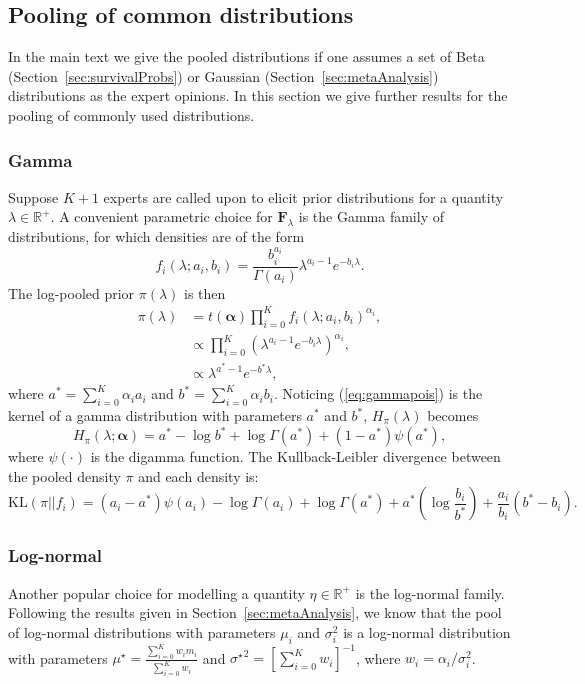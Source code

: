 \documentclass[a4paper, notitlepage, 11pt]{article}
\begin{document}
\newpage
\subsection{Pooling of common distributions}
\label{sec:appendix_common_poolings}

In the main text we give the pooled distributions if one assumes a set of Beta (Section~\ref{sec:survivalProbs}) or Gaussian (Section~\ref{sec:metaAnalysis}) distributions as the expert opinions.
In this section we give further results for the pooling of commonly used distributions.

\subsubsection{Gamma}
\label{sec:gamma}
Suppose $K + 1$ experts are called upon to elicit prior distributions for a quantity $\lambda \in \mathbb{R}^+$.
A convenient parametric choice for $\mathbf{F}_\lambda$ is the Gamma family of distributions, for which densities are of the form
$$ f_i(\lambda;a_i,b_i) = \frac{b_i^{a_i}}{\Gamma(a_i)} \lambda^{a_i-1} e^{-b_i\lambda}.$$
The log-pooled prior $\pi(\lambda)$ is then
\begin{align}
\nonumber
\pi(\lambda)&= t(\boldsymbol\alpha)\prod_{i=0}^{K}f_i(\lambda;a_i,b_i)^{\alpha_i},\\
\nonumber
&\propto \prod_{i=0}^{K} \left(\lambda^{a_i-1} e^{-b_i\lambda}\right)^{\alpha_i},\\
\label{eq:gammapois}
&\propto \lambda^{a^*-1} e^{-b^*\lambda},
\end{align}
where $a^* =\sum_{i=0}^{K}\alpha_ia_i$ and $b^* = \sum_{i=0}^{K}\alpha_ib_i$.
Noticing (\ref{eq:gammapois}) is the kernel of a gamma distribution with parameters $a^*$ and $b^*$, $H_{\pi}(\lambda)$ becomes
\begin{equation}
\label{eq:entropygamma}
H_{\pi}(\lambda; \boldsymbol\alpha) = a^* - \log b^* + \log \Gamma(a^*) + (1-a^*)\psi(a^*),
\end{equation}
where $\psi(\cdot)$ is the digamma function.
The Kullback-Leibler divergence between the pooled density $\pi$ and each density is:
\begin{equation}
 \label{eq:KLgamma}
 \text{KL}(\pi || f_i) = (a_i-a^*)\psi(a_i) - \log\Gamma(a_i) + \log\Gamma(a^*) + a^*\left(\log\frac{b_i}{b^*}\right) + \frac{a_i}{b_i}(b^*-b_i).
\end{equation}

\subsubsection{Log-normal} 
\label{sec:log-normal}
Another popular choice for modelling a quantity $\eta \in \mathbb{R}^+$ is the log-normal family.
Following the results given in Section~\ref{sec:metaAnalysis}, we know that the pool of log-normal distributions with parameters $\mu_i$ and $\sigma_i^2$ is a log-normal distribution with parameters $\mu^\star = \frac{\sum_{i=0}^K w_im_i}{\sum_{i=0}^K w_i}$ and ${\sigma^\star}^2 = [\sum_{i=0}^K w_i]^{-1}$,  where $w_i = \alpha_i/\sigma_i^2$.
\end{document}
